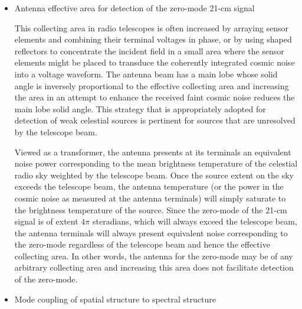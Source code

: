 \begin{itemize}

  \item
  Antenna effective area for detection of the zero-mode 21-cm signal
  
   This collecting area in radio telescopes is often increased by arraying sensor elements and combining their terminal voltages in phase, or by using shaped reflectors to concentrate the incident field in a small area where the sensor elements might be placed to transduce the coherently integrated cosmic noise into a voltage waveform.  The antenna beam has a main lobe whose solid angle is inversely proportional to the effective collecting area and increasing the area in an attempt to enhance the received faint cosmic noise reduces the main lobe solid angle.  This strategy that is appropriately adopted for detection of weak celestial sources is pertinent for sources that are unresolved by the telescope beam.  
   
   Viewed as a transformer, the antenna presents at its terminals an equivalent noise power corresponding to the mean brightness temperature of the celestial radio sky weighted by the telescope beam.  Once the source extent on the sky exceeds the telescope beam, the antenna temperature (or the power in the cosmic noise as measured at the antenna terminals) will simply saturate to the brightness temperature of the source.  Since the zero-mode of the 21-cm signal is of extent $4\pi$ steradians, which will always exceed the telescope beam, the antenna terminals will always present equivalent noise corresponding to the zero-mode regardless of the telescope beam and hence the effective collecting area.  In other words, the antenna for the zero-mode may be of any arbitrary collecting area and increasing this area does not facilitate detection of the zero-mode.
   
   \item
   Mode coupling of spatial structure to spectral structure
 

\end{itemize}
